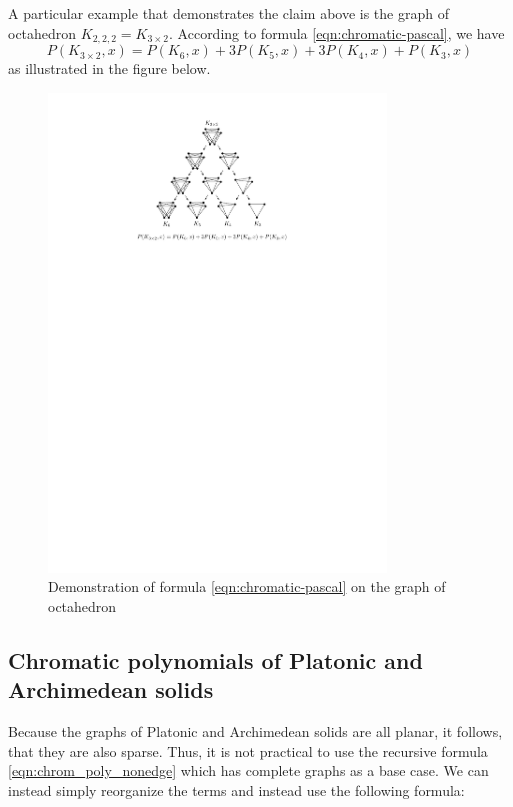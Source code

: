 A particular example that demonstrates the claim above is the graph of octahedron $K_{2,2,2} = K_{3 \times 2}$. According to formula \ref{eqn:chromatic-pascal}, we have \[ P(K_{3 \times 2},x) = P(K_6,x)+3P(K_5,x) + 3P(K_4,x)+P(K_3,x)\] as illustrated in the figure below.


\begin{figure}[H]
    \centering
    \includegraphics[width=0.8\textwidth]{Resources/Figs/octahedral_pascal_demo.pdf}
    \caption{Demonstration of formula \ref{eqn:chromatic-pascal} on the graph of octahedron}
\end{figure}

\subsection{Chromatic polynomials of Platonic and Archimedean solids}

Because the graphs of Platonic and Archimedean solids are all planar, it follows, that they are also sparse. Thus, it is not practical to use the recursive formula \ref{eqn:chrom_poly_nonedge} which has complete graphs as a base case. We can instead simply reorganize the terms and instead use the following formula:

